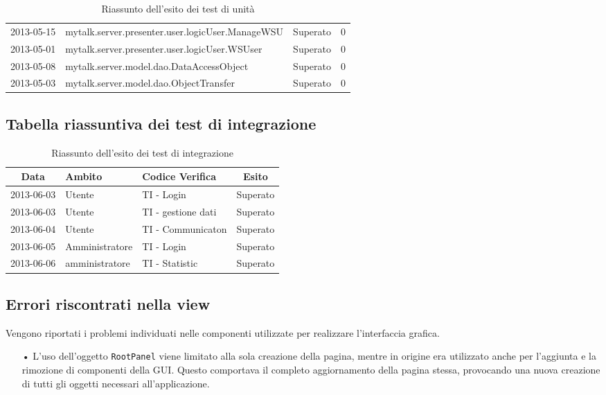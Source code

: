 {{\begin{table}[h!]
\begin{center}
\begin{tabular}{c l c c}
					2013-05-15 & mytalk.server.presenter.user.logicUser.ManageWSU & Superato & 0 \\
					2013-05-01 & mytalk.server.presenter.user.logicUser.WSUser & Superato & 0 \\
					2013-05-08 & mytalk.server.model.dao.DataAccessObject	 & Superato & 0 \\
					2013-05-03 & mytalk.server.model.dao.ObjectTransfer	 	& Superato & 0 \\
					\bottomrule
				\end{tabular}
			\end{center}	
			\caption{Riassunto dell'esito dei test di unità} 
		\end{table}
	}
	
	\subsection{Tabella riassuntiva dei test di integrazione}{
		\begin{table}[h!]
			\scriptsize
			\begin{center}
				\begin{tabular}{c l l c}				
					\toprule
					Data 	& Ambito & Codice Verifica & Esito \\ 
					\midrule
					2013-06-03 & Utente & TI - Login	& Superato\\ 
					2013-06-03 & Utente & TI - gestione dati & Superato\\ 
					2013-06-04 & Utente & TI - Communicaton	 & Superato\\ 
					2013-06-05 & Amministratore & TI - Login	 	& Superato\\ 
					2013-06-06 & amministratore & TI - Statistic	 & Superato  \\										
					\bottomrule
				\end{tabular}
			\end{center}	
			\caption{Riassunto dell'esito dei test di integrazione} 
		\end{table}
	}
	
	\subsection{Errori riscontrati nella view}{
	Vengono riportati i problemi individuati nelle componenti utilizzate per realizzare l'interfaccia grafica.
	\begin{itemize}
		\item[•] L'uso dell'oggetto \texttt{RootPanel} viene limitato alla sola creazione della pagina, mentre in origine era utilizzato anche per l'aggiunta e la rimozione di componenti della GUI\g. Questo comportava il completo aggiornamento della pagina stessa, provocando una nuova creazione di tutti gli oggetti necessari all'applicazione.
		

\end{itemize}}}
